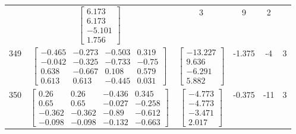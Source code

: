 \documentclass[a4paper,12pt]{article}
\begin{document}
\begin{tabular}{c c c c c c}
&
$\begin{bmatrix} 6.173 \\ 6.173 \\ -5.101 \\ 1.756 \end{bmatrix}$
&
3
&
9
&
2
\\
349
&
$\begin{bmatrix} -0.465 & -0.273 & -0.503 & 0.319 \\ -0.042 & -0.325 & -0.733 & -0.75 \\ 0.638 & -0.667 & 0.108 & 0.579 \\ 0.613 & 0.613 & -0.445 & 0.031 \end{bmatrix}$
&
$\begin{bmatrix} -13.227 \\ 9.636 \\ -6.291 \\ 5.882 \end{bmatrix}$
&
-1.375
&
-4
&
3
\\
350
&
$\begin{bmatrix} 0.26 & 0.26 & -0.436 & 0.345 \\ 0.65 & 0.65 & -0.027 & -0.258 \\ -0.362 & -0.362 & -0.89 & -0.612 \\ -0.098 & -0.098 & -0.132 & -0.663 \end{bmatrix}$
&
$\begin{bmatrix} -4.773 \\ -4.773 \\ -3.471 \\ 2.017 \end{bmatrix}$
&
-0.375
&
-11
&
3
\\
\end{tabular} \egroup \newpage
\end{document}
